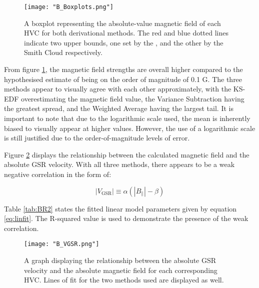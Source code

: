 \begin{figure}
    \texttt{[image: "B\_Boxplots.png"]}
    \centering
    \caption{A boxplot representing the absolute-value magnetic field of each HVC for both derivational methods. The red and blue dotted lines indicate two upper bounds, one set by the \citeauthor[][simulations]{ID23}, and the other by the Smith Cloud respectively.}
    \label{fig:BBox}
\end{figure}


From figure \ref{fig:BBox}, the magnetic field strengths are overall higher compared to the hypothesised estimate of being on the order of magnitude of 0.1 {\textmu}G. The three methods appear to visually agree with each other approximately, with the KS-EDF overestimating the magnetic field value, the Variance Subtraction having the greatest spread, and the Weighted Average having the largest tail. It is important to note that due to the logarithmic scale used, the mean is inherently biased to visually appear at higher values. However, the use of a logarithmic scale is still justified due to the order-of-magnitude levels of error.


Figure \ref{fig:VGSR} displays the relationship between the calculated magnetic field and the absolute GSR velocity. With all three methods, there appears to be a weak negative correlation in the form of:

\begin{equation}
    |V_{\mathrm{GSR}}|\equiv\alpha\left(|B_{\parallel}|-\beta\right)
\label{eq:linfit}
\end{equation}

Table \ref{tab:BR2} states the fitted linear model parameters given by equation \ref{eq:linfit}. The R-squared value is used to demonstrate the presence of the weak correlation.


\begin{figure}
    \texttt{[image: "B\_VGSR.png"]}
    \centering
    \caption{A graph displaying the relationship between the absolute GSR velocity and the absolute magnetic field for each corresponding HVC. Lines of fit for the two methods used are displayed as well.}
    \label{fig:VGSR}
\end{figure}


